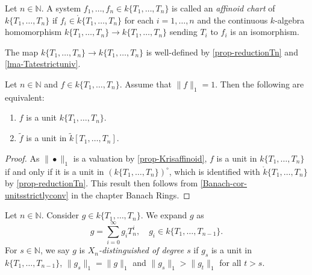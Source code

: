 \begin{definition}\label{def-affchart}
    Let $n\in \mathbb{N}$. A system $f_1,\ldots,f_n\in k\{T_1,\ldots,T_n\}$ is called an \emph{affinoid chart} of $k\{T_1,\ldots,T_n\}$ if $f_i\in \mathring{k}\{T_1,\ldots,T_n\}$ for each $i=1,\ldots,n$ and the continuous $k$-algebra homomorphism $k\{T_1,\ldots,T_n\}\rightarrow k\{T_1,\ldots,T_n\}$ sending $T_i$ to $f_i$ is an isomorphism.
\end{definition}
The map $k\{T_1,\ldots,T_n\}\rightarrow k\{T_1,\ldots,T_n\}$ is well-defined by \cref{prop-reductionTn} and \cref{lma-Tatestrictuniv}.


\begin{lemma}\label{lma-unitsTate}
    Let $n\in \mathbb{N}$ and $f\in k\{T_1,\ldots,T_n\}$. Assume that $\|f\|_1=1$. Then the following are equivalent:
    \begin{enumerate}
        \item $f$ is a unit $k\{T_1,\ldots,T_n\}$.
        \item $\tilde{f}$ is a unit in $\tilde{k}[T_1,\ldots,T_n]$.
    \end{enumerate}
\end{lemma}
\begin{proof}
    As $\|\bullet\|_1$ is a valuation by \cref{prop-Krisaffinoid}, $f$ is a unit in $k\{T_1,\ldots,T_n\}$ if and only if it is a unit in $(k\{T_1,\ldots,T_n\} )^{\circ}$, which is identified with $\mathring{k}\{T_1,\ldots,T_n\}$ by \cref{prop-reductionTn}. This result then follows from \cref{Banach-cor-unitsstrictlyconv} in the chapter Banach Rings.
\end{proof}

\begin{definition}
   Let $n\in \mathbb{N}$. Consider $g\in k\{T_1,\ldots,T_n\}$. We expand $g$ as
   \[
        g=\sum_{i=0}^{\infty}g_i T_n^{i},\quad g_i\in k\{T_1,\ldots,T_{n-1}\}.
   \] 
   For $s\in \mathbb{N}$, we say $g$ is \emph{$X_n$-distinguished of degree $s$} if $g_s$ is a unit in $k\{T_1,\ldots,T_{n-1}\}$, $\|g_s\|_{1}=\|g\|_1$ and $\|g_s\|_1>\|g_{t}\|_1$ for all $t>s$.
\end{definition}

